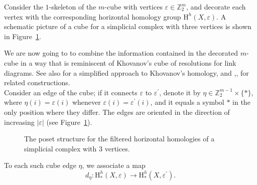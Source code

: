 \documentclass[11pt, a4paper, reqno, twoside, makeidx]{amsart}
\theoremstyle{remark}
\theoremstyle{plain}
\theoremstyle{definition}
\newcommand{\Z}{\mathbb{Z}}
\newcommand{\HH}{\mathrm{H}}
\begin{document}
Consider the $1$-skeleton of the $m$-cube with vertices $\varepsilon \in \Z_2^m$, and decorate each vertex with the corresponding horizontal homology group $\HH^h(X,\varepsilon)$. A schematic picture of a cube for a simplicial complex with three vertices is shown in Figure~\ref{fig:cubo}.



We are now going to  to combine the information contained in the decorated $m$-cube in a way that is reminiscent of Khovanov's cube of resolutions \cite{khovanov2000categorification} for link diagrams. See also \cite{bar2002khovanov} for a simplified approach to Khovanov's homology, and \cite{helme2005categorification},\cite{loebl2008chromatic}, \cite{everitt2009homology} for related constructions.\\

Consider an edge of the cube; if it connects $\varepsilon$ to $\varepsilon^\prime$, denote it by $\eta \in \Z_2^{m-1}\times \{*\}$, where $\eta(i) = \varepsilon(i)$ whenever $\varepsilon(i) = \varepsilon^\prime (i)$, and it equals a symbol $*$ in the only position where they differ. The edges are oriented in the direction of increasing $|\varepsilon|$ (see Figure~\ref{fig:cubo}).

\begin{figure}[ht]
\caption{The poset structure for the filtered horizontal homologies of a simplicial complex with $3$ vertices.} 
\label{fig:cubo} 
\end{figure}


To each such cube edge $\eta$, we associate a map 
\begin{equation}\label{eqn:deta}
d_\eta: \HH_*^h(X,\varepsilon) \longrightarrow  \HH_*^h(X,\varepsilon^\prime). 
\end{equation}
\end{document}
